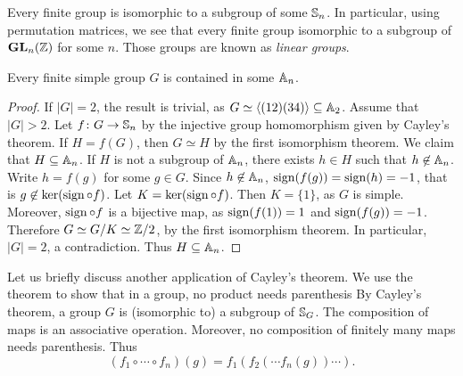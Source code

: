 Every finite group is isomorphic to a subgroup of some 
$\mathbb{S}_n$. 
In particular, using permutation matrices, 
we see that every finite group 
isomorphic to a subgroup of $\mathbf{GL}_n(\mathbb{Z})$ for some $n$.
Those groups are known as \emph{linear groups}.

\begin{proposition}
Every finite simple group $G$ is contained in some $\mathbb{A}_n$.
\end{proposition}

\begin{proof}
If $|G|=2$, the result is trivial, as $G\simeq\langle (12)(34)\rangle\subseteq\mathbb{A}_2$. Assume 
that $|G|>2$.
Let $f\colon G\to\mathbb{S}_n$ by the injective group homomorphism
given by Cayley's theorem. If $H=f(G)$, then 
$G\simeq H$ by the first isomorphism theorem. 
We claim that $H\subseteq\mathbb{A}_n$. If
$H$ is not a subgroup of $\mathbb{A}_n$, there exists $h\in H$ such that  $h\not\in\mathbb{A}_n$. Write $h=f(g)$ for some 
$g\in G$. Since $h\not\in\mathbb{A}_n$,
$\operatorname{sign}(f(g))=\operatorname{sign}(h)=-1$, that is 
$g\not\in\ker(\operatorname{sign}\circ f)$.
Let $K=\ker(\operatorname{sign}\circ f)$. Then $K=\{1\}$, as $G$ is simple. Moreover, $\operatorname{sign}\circ f$ is a bijective map, as
$\operatorname{sign}(f(1))=1$ and $\operatorname{sign}(f(g))=-1$. Therefore 
$G\simeq G/K\simeq\mathbb{Z}/2$, by the first isomorphism theorem.  
In particular, $|G|=2$, a contradiction. Thus $H\subseteq\mathbb{A}_n$.
\end{proof}

Let us briefly discuss another application of Cayley's theorem. 
We use the theorem to show that in a group, 
no product needs parenthesis 
By Cayley's theorem, a group $G$ is (isomorphic to) a 
subgroup of $\mathbb{S}_G$. The composition of maps is an associative operation. Moreover, no composition of finitely many maps 
needs parenthesis. Thus 
\[
(f_1\circ\cdots\circ f_n)(g)=f_1(f_2(\cdots f_n(g))\cdots).
\]
